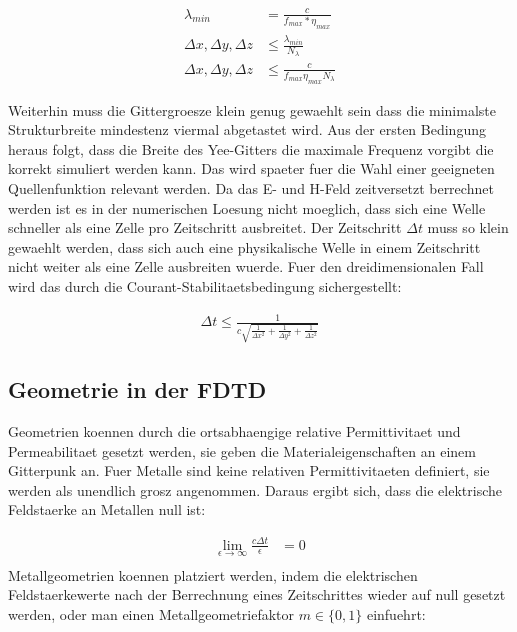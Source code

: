 \documentclass[11pt, ngerman]{article}
\begin{document}
\begin{align}
	\lambda_{min} &= \frac{c}{f_{max}*\eta_{max}}\\
	\Delta x, \Delta y, \Delta z &\leq \frac{\lambda_{min}}{N_\lambda}\\
	\Delta x, \Delta y, \Delta z &\leq \frac{c}{f_{max}\eta_{max}N_\lambda}
\end{align}

Weiterhin muss die Gittergroesze klein genug gewaehlt sein dass die minimalste
Strukturbreite mindestenz viermal abgetastet wird\cite{grid_stability_condition}.
Aus der ersten Bedingung heraus folgt, dass die Breite des Yee-Gitters die maximale
Frequenz vorgibt die korrekt simuliert werden kann. Das wird spaeter fuer die
Wahl einer geeigneten Quellenfunktion relevant werden.
Da das E- und H-Feld zeitversetzt berrechnet werden ist es in der numerischen
Loesung nicht moeglich, dass sich eine Welle schneller als eine Zelle pro
Zeitschritt ausbreitet. Der Zeitschritt \(\Delta t\) muss so klein gewaehlt werden, dass sich auch eine physikalische Welle in einem Zeitschritt nicht weiter als eine 
Zelle ausbreiten wuerde. Fuer den dreidimensionalen Fall wird das durch
die Courant-Stabilitaetsbedingung sichergestellt\cite{time_stability_condition}:

\begin{align}
	\Delta t \leq \frac{1}{c\sqrt{\frac{1}{\Delta x^2} + \frac{1}{\Delta y^2} +\frac{1}{\Delta z^2}}}
\end{align}

\subsection{Geometrie in der FDTD}
Geometrien koennen durch die ortsabhaengige relative Permittivitaet und Permeabilitaet gesetzt werden, sie geben die Materialeigenschaften an einem Gitterpunk an.
Fuer Metalle sind keine relativen Permittivitaeten definiert, sie werden als unendlich grosz angenommen.
Daraus ergibt sich, dass die elektrische Feldstaerke an Metallen null ist:

\begin{align}
	\lim_{\epsilon\to\infty}\frac{c\Delta t}{\epsilon} &= 0\\
\end{align}
Metallgeometrien koennen platziert werden, indem die elektrischen Feldstaerkewerte nach der Berrechnung eines Zeitschrittes wieder auf null gesetzt
werden, oder man einen Metallgeometriefaktor \(m \in \{0, 1\}\) einfuehrt:
\end{document}
